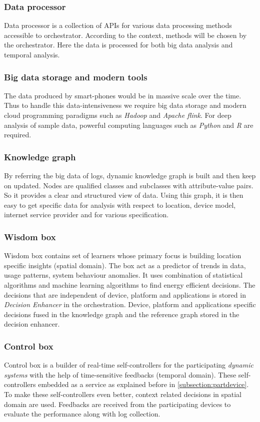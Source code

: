 \subsubsection{Data processor}
Data processor is a collection of APIs for various data processing methods accessible to orchestrator. According to the context, methods will be chosen by the orchestrator. Here the data is processed for both big data analysis and temporal analysis.
\subsubsection{Big data storage and modern tools}
The data produced by smart-phones would be in massive scale over the time. Thus to handle this data-intensiveness we require big data storage and modern cloud programming paradigms such as \emph{Hadoop} and \emph{Apache flink}. For deep analysis of sample data, powerful  computing languages such as \emph{Python} and \emph{R} are required.
\subsubsection{Knowledge graph}
By referring the big data of logs, dynamic knowledge graph is built and then keep on updated. Nodes are qualified classes and subclasses with attribute-value pairs. So it provides a clear and structured view of data. Using this graph, it is then easy to get specific data for analysis with respect to location, device model, internet service provider and for various specification.
\subsubsection{Wisdom box}
Wisdom box contains set of learners whose primary focus is building location specific insights (spatial domain). The box act as a predictor of trends in data, usage patterns, system behaviour anomalies. It uses combination of statistical algorithms and machine learning algorithms to find energy efficient decisions. The decisions that are independent of device, platform and applications is stored in \emph{Decision Enhancer} in the orchestration. Device, platform and applications specific decisions fused in the knowledge graph and the reference graph stored in the decision enhancer. 
\subsubsection{Control box}
Control box is a builder of real-time self-controllers for the participating \textit{dynamic systems} with the help of time-sensitive feedbacks (temporal domain). These self-controllers embedded as a service as explained before in \ref{subsection:partdevice}. To make these self-controllers even better, context related decisions in spatial domain are used. Feedbacks are received from the participating devices to evaluate the performance along with log collection.

